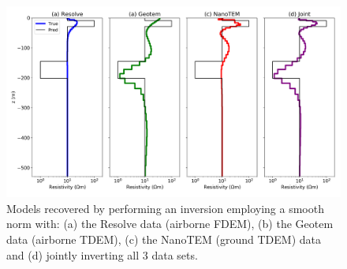 \begin{figure}
    \begin{center}
    \includegraphics[width=0.8\columnwidth]{figures/independent-inversions.png}
    \end{center}
\caption{
    Models recovered by performing an inversion employing a smooth norm with: (a) the Resolve data (airborne FDEM), (b) the Geotem data (airborne TDEM), (c) the NanoTEM (ground TDEM) data and (d) jointly inverting all 3 data sets.
}
\label{fig:independent-inversions}
\end{figure}
